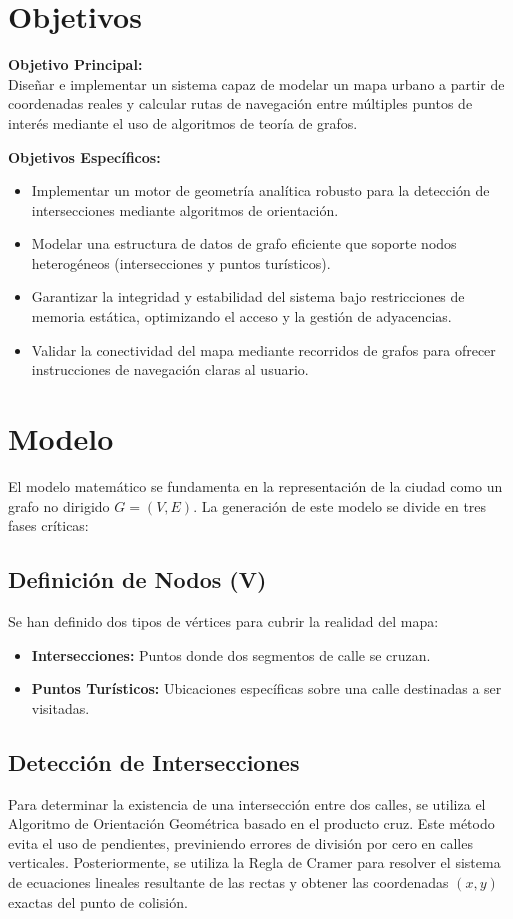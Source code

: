 \documentclass[12pt, a4paper]{article}
\begin{document}
\section{Objetivos}
\textbf{Objetivo Principal:} \\
Diseñar e implementar un sistema capaz de modelar un mapa urbano a partir de coordenadas reales y calcular rutas de navegación entre múltiples puntos de interés mediante el uso de algoritmos de teoría de grafos.

\textbf{Objetivos Específicos:}
\begin{itemize}
    \item Implementar un motor de geometría analítica robusto para la detección de intersecciones mediante algoritmos de orientación.
    \item Modelar una estructura de datos de grafo eficiente que soporte nodos heterogéneos (intersecciones y puntos turísticos).
    \item Garantizar la integridad y estabilidad del sistema bajo restricciones de memoria estática, optimizando el acceso y la gestión de adyacencias.
    \item Validar la conectividad del mapa mediante recorridos de grafos para ofrecer instrucciones de navegación claras al usuario.
\end{itemize}

\section{Modelo}
El modelo matemático se fundamenta en la representación de la ciudad como un grafo no dirigido $G = (V, E)$. La generación de este modelo se divide en tres fases críticas:

\subsection{Definición de Nodos (V)}
Se han definido dos tipos de vértices para cubrir la realidad del mapa:
\begin{itemize}
    \item \textbf{Intersecciones:} Puntos donde dos segmentos de calle se cruzan.
    \item \textbf{Puntos Turísticos:} Ubicaciones específicas sobre una calle destinadas a ser visitadas.
\end{itemize}

\subsection{Detección de Intersecciones}
Para determinar la existencia de una intersección entre dos calles, se utiliza el Algoritmo de Orientación Geométrica basado en el producto cruz. Este método evita el uso de pendientes, previniendo errores de división por cero en calles verticales. Posteriormente, se utiliza la Regla de Cramer para resolver el sistema de ecuaciones lineales resultante de las rectas y obtener las coordenadas $(x, y)$ exactas del punto de colisión.
\end{document}
